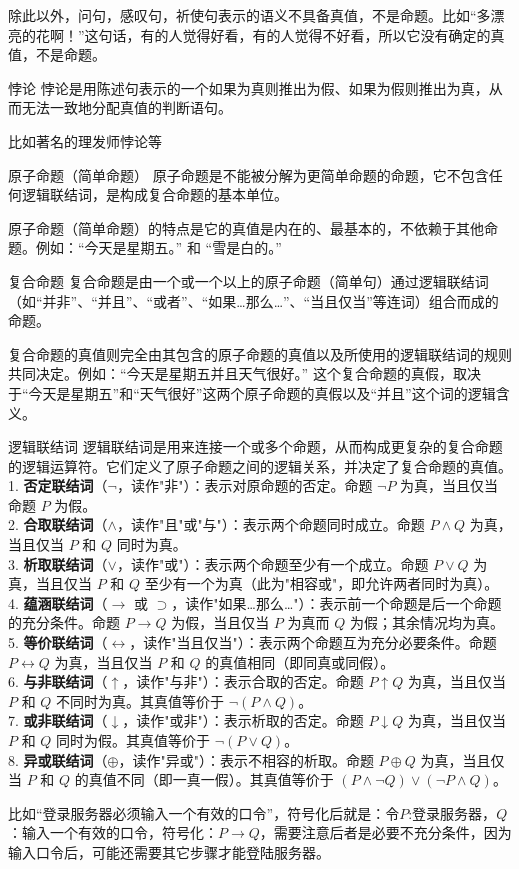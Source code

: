 除此以外，问句，感叹句，祈使句表示的语义不具备真值，不是命题。比如“多漂亮的花啊！”这句话，有的人觉得好看，有的人觉得不好看，所以它没有确定的真值，不是命题。
\begin{definition}{悖论}{}
悖论是用陈述句表示的一个如果为真则推出为假、如果为假则推出为真，从而无法一致地分配真值的判断语句。
\end{definition}
比如著名的理发师悖论等
\begin{definition}{原子命题（简单命题）}{}
原子命题是不能被分解为更简单命题的命题，它不包含任何逻辑联结词，是构成复合命题的基本单位。
\end{definition}
原子命题（简单命题）​ 的特点是它的真值是内在的、最基本的，不依赖于其他命题。例如：“今天是星期五。” 和 “雪是白的。”
\begin{definition}{复合命题}{}
复合命题是由一个或一个以上的原子命题（简单句）通过逻辑联结词（如“并非”、“并且”、“或者”、“如果…那么…”、“当且仅当”等连词）组合而成的命题。
\end{definition}
复合命题​的真值则完全由其包含的原子命题的真值以及所使用的逻辑联结词的规则共同决定。例如：“今天是星期五并且天气很好。” 这个复合命题的真假，取决于“今天是星期五”和“天气很好”这两个原子命题的真假以及“并且”这个词的逻辑含义。
\begin{definition}{逻辑联结词}{}
    逻辑联结词是用来连接一个或多个命题，从而构成更复杂的复合命题的逻辑运算符。它们定义了原子命题之间的逻辑关系，并决定了复合命题的真值。\\
    1. \textbf{否定联结词}（$\neg$，读作"非"）：表示对原命题的否定。命题 $\neg P$ 为真，当且仅当命题 $P$ 为假。\\
    2. \textbf{合取联结词}（$\land$，读作"且"或"与"）：表示两个命题同时成立。命题 $P \land Q$ 为真，当且仅当 $P$ 和 $Q$ 同时为真。\\
    3. \textbf{析取联结词}（$\lor$，读作"或"）：表示两个命题至少有一个成立。命题 $P \lor Q$ 为真，当且仅当 $P$ 和 $Q$ 至少有一个为真（此为"相容或"，即允许两者同时为真）。\\
    4. \textbf{蕴涵联结词}（$\rightarrow$ 或 $\supset$，读作"如果…那么…"）：表示前一个命题是后一个命题的充分条件。命题 $P \rightarrow Q$ 为假，当且仅当 $P$ 为真而 $Q$ 为假；其余情况均为真。\\
    5. \textbf{等价联结词}（$\leftrightarrow$，读作"当且仅当"）：表示两个命题互为充分必要条件。命题 $P \leftrightarrow Q$ 为真，当且仅当 $P$ 和 $Q$ 的真值相同（即同真或同假）。\\
    6. \textbf{与非联结词}（$\uparrow$，读作"与非"）：表示合取的否定。命题 $P \uparrow Q$ 为真，当且仅当 $P$ 和 $Q$ 不同时为真。其真值等价于 $\neg(P \land Q)$。\\
    7. \textbf{或非联结词}（$\downarrow$，读作"或非"）：表示析取的否定。命题 $P \downarrow Q$ 为真，当且仅当 $P$ 和 $Q$ 同时为假。其真值等价于 $\neg(P \lor Q)$。\\
    8. \textbf{异或联结词}（$\oplus$，读作"异或"）：表示不相容的析取。命题 $P \oplus Q$ 为真，当且仅当 $P$ 和 $Q$ 的真值不同（即一真一假）。其真值等价于 $(P \land \neg Q) \lor (\neg P \land Q)$。
\end{definition}
比如“登录服务器必须输入一个有效的口令”，符号化后就是：令$P$:登录服务器，$Q$：输入一个有效的口令，符号化：$P \rightarrow Q$，需要注意后者是必要不充分条件，因为输入口令后，可能还需要其它步骤才能登陆服务器。

